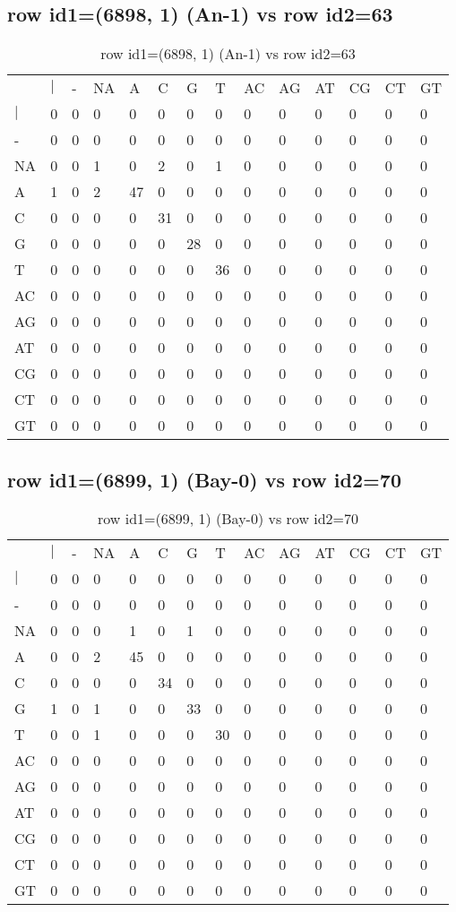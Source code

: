 \subsection{row id1=(6898, 1) (An-1) vs row id2=63}
\begin{center}
\begin{longtable}{|l|l|l|l|l|l|l|l|l|l|l|l|l|l|}
\caption{row id1=(6898, 1) (An-1) vs row id2=63} \label{table_dm58}\\
\hline
\\
\hline
&$|$&-&NA&A&C&G&T&AC&AG&AT&CG&CT&GT\\
$|$&0&0&0&0&0&0&0&0&0&0&0&0&0\\
-&0&0&0&0&0&0&0&0&0&0&0&0&0\\
NA&0&0&1&0&2&0&1&0&0&0&0&0&0\\
A&1&0&2&47&0&0&0&0&0&0&0&0&0\\
C&0&0&0&0&31&0&0&0&0&0&0&0&0\\
G&0&0&0&0&0&28&0&0&0&0&0&0&0\\
T&0&0&0&0&0&0&36&0&0&0&0&0&0\\
AC&0&0&0&0&0&0&0&0&0&0&0&0&0\\
AG&0&0&0&0&0&0&0&0&0&0&0&0&0\\
AT&0&0&0&0&0&0&0&0&0&0&0&0&0\\
CG&0&0&0&0&0&0&0&0&0&0&0&0&0\\
CT&0&0&0&0&0&0&0&0&0&0&0&0&0\\
GT&0&0&0&0&0&0&0&0&0&0&0&0&0\\
\hline
\end{longtable}
\end{center}

\subsection{row id1=(6899, 1) (Bay-0) vs row id2=70}
\begin{center}
\begin{longtable}{|l|l|l|l|l|l|l|l|l|l|l|l|l|l|}
\caption{row id1=(6899, 1) (Bay-0) vs row id2=70} \label{table_dm60}\\
\hline
\\
\hline
&$|$&-&NA&A&C&G&T&AC&AG&AT&CG&CT&GT\\
$|$&0&0&0&0&0&0&0&0&0&0&0&0&0\\
-&0&0&0&0&0&0&0&0&0&0&0&0&0\\
NA&0&0&0&1&0&1&0&0&0&0&0&0&0\\
A&0&0&2&45&0&0&0&0&0&0&0&0&0\\
C&0&0&0&0&34&0&0&0&0&0&0&0&0\\
G&1&0&1&0&0&33&0&0&0&0&0&0&0\\
T&0&0&1&0&0&0&30&0&0&0&0&0&0\\
AC&0&0&0&0&0&0&0&0&0&0&0&0&0\\
AG&0&0&0&0&0&0&0&0&0&0&0&0&0\\
AT&0&0&0&0&0&0&0&0&0&0&0&0&0\\
CG&0&0&0&0&0&0&0&0&0&0&0&0&0\\
CT&0&0&0&0&0&0&0&0&0&0&0&0&0\\
GT&0&0&0&0&0&0&0&0&0&0&0&0&0\\
\hline
\end{longtable}
\end{center}


